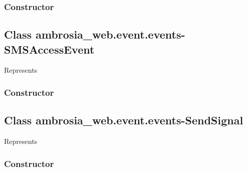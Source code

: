 \documentclass[letterpaper,10pt,english]{sphinxmanual}
\begin{document}
\subsubsection{Constructor}
\label{ambrosia_web.event.events-SMSAccess:constructor}

\begin{fulllineitems}
\label{ambrosia_web.event.events-SMSAccess:ambrosia_web.event.events-SMSAccess}
\end{fulllineitems}



\subsection{Class ambrosia\_web.event.events-SMSAccessEvent}
\label{ambrosia_web.event.events-SMSAccessEvent::doc}\label{ambrosia_web.event.events-SMSAccessEvent:class-ambrosia-web-event-events-smsaccessevent}
Represents {\hyperref[ambrosia_plugins.apimonitor:ambrosia_plugins.apimonitor.SMSAccessEvent]{}}


\subsubsection{Constructor}
\label{ambrosia_web.event.events-SMSAccessEvent:constructor}

\begin{fulllineitems}
\label{ambrosia_web.event.events-SMSAccessEvent:ambrosia_web.event.events-SMSAccessEvent}
\end{fulllineitems}



\subsection{Class ambrosia\_web.event.events-SendSignal}
\label{ambrosia_web.event.events-SendSignal::doc}\label{ambrosia_web.event.events-SendSignal:class-ambrosia-web-event-events-sendsignal}
Represents 


\subsubsection{Constructor}
\label{ambrosia_web.event.events-SendSignal:constructor}
\end{document}
